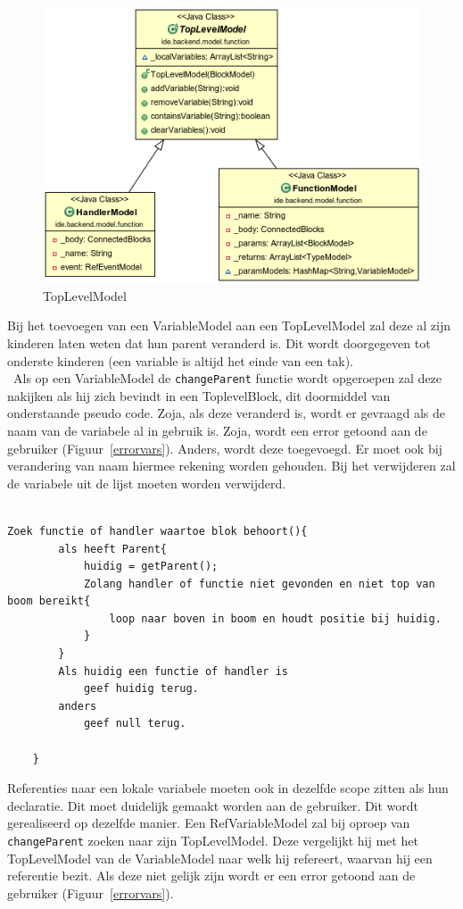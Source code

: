 \documentclass[]{article}
\begin{document}
\begin{figure}[H]
  \centering
\includegraphics[scale=0.4]{AnalyseADTAlgorithm/blockmodel/topleveluml}
  \caption{TopLevelModel} \label{TopModelUML}
\end{figure}
Bij het toevoegen van een VariableModel aan een TopLevelModel zal deze al zijn kinderen laten weten dat hun parent veranderd is. Dit wordt doorgegeven tot onderste kinderen (een variable is altijd het einde van een tak).\\\ Als op een VariableModel de \texttt{changeParent} functie wordt opgeroepen zal deze nakijken als hij zich bevindt in een ToplevelBlock, dit doormiddel van onderstaande pseudo code. Zoja, als deze veranderd is, wordt er gevraagd als de naam van de variabele al in gebruik is. Zoja, wordt een error getoond aan de gebruiker (Figuur~\ref{errorvars}). Anders, wordt deze toegevoegd. Er moet ook bij verandering van naam hiermee rekening worden gehouden.  Bij het verwijderen zal de variabele uit de lijst moeten worden verwijderd.\\\\
\lstset{language=Java}
\begin{lstlisting}
Zoek functie of handler waartoe blok behoort(){
		als heeft Parent{
			huidig = getParent();
			Zolang handler of functie niet gevonden en niet top van boom bereikt{
				loop naar boven in boom en houdt positie bij huidig.
			}
		}
		Als huidig een functie of handler is
			geef huidig terug.
		anders
			geef null terug.
			
	}
\end{lstlisting}
Referenties naar een lokale variabele moeten ook in dezelfde scope zitten als hun declaratie. Dit moet duidelijk gemaakt worden aan de gebruiker. Dit wordt gerealiseerd op dezelfde manier. Een RefVariableModel zal bij oproep van \texttt{changeParent} zoeken naar zijn TopLevelModel. Deze vergelijkt hij met het TopLevelModel van de VariableModel naar welk hij refereert, waarvan hij een referentie bezit. Als deze niet gelijk zijn wordt er een error getoond aan de gebruiker (Figuur~\ref{errorvars}).\\\\ 
\end{document}
